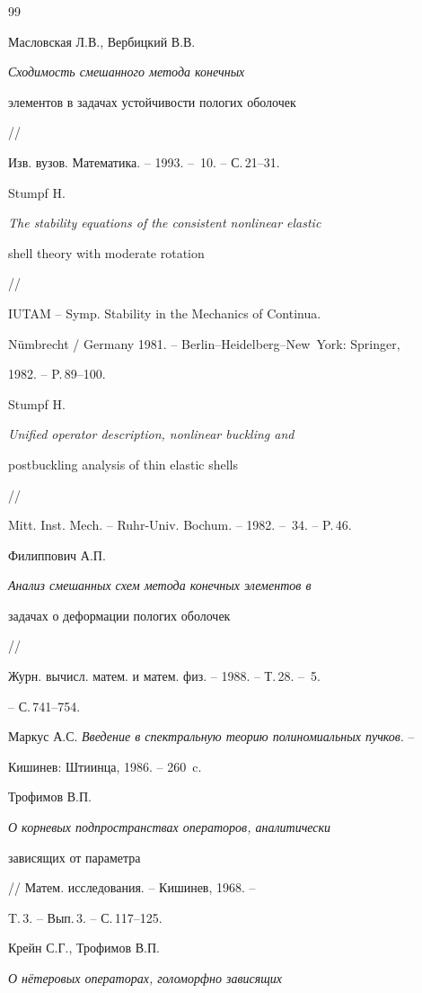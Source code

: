 \begin{thebibliography}{99}







Масловская Л.В., Вербицкий В.В. {\em Сходимость смешанного метода конечных


элементов в задачах устойчивости пологих оболочек} //


Изв. вузов. Математика. -- 1993. -- \No\,10. -- С.\,21--31.




Stumpf H. {\em The stability equations of the consistent nonlinear elastic


shell theory with moderate rotation} //


IUTAM -- Symp. Stability in the Mechanics of Continua.


N\"umbrecht / Germany 1981. -- Berlin--Heidelberg--New~York: Springer,


1982. -- P.\,89--100.




Stumpf H. {\em Unified operator description, nonlinear buckling and


postbuckling analysis of thin elastic shells} //


Mitt. Inst. Mech. -- Ruhr-Univ. Bochum. -- 1982. -- \No\,34. -- P.\,46.




Филиппович А.П. {\em Анализ смешанных схем метода конечных элементов в


задачах о деформации пологих оболочек} //


Журн. вычисл. матем. и матем. физ. -- 1988. -- Т.\,28. -- \No\,5.


-- С.\,741--754.




Маркус А.С. {\em Введение в спектральную теорию полиномиальных пучков}. --


Кишинев: Штиинца, 1986. -- 260~c.




Трофимов В.П. {\em О корневых подпространствах операторов, аналитически


зависящих от параметра} // Матем. исследования. -- Кишинев, 1968. --


T.\,3. -- Вып.\,3. -- С.\,117--125.




Крейн С.Г., Трофимов В.П. {\em О н\"етеровых операторах, голоморфно зависящих


}
\end{thebibliography}

